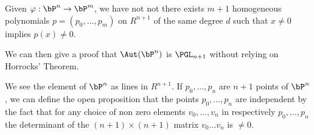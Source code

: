 \begin{lemma}\label{weakmap}
  Given $\varphi:\bP^n\rightarrow  \bP^m$, we have not not there exists
  $m+1$ homogeneous polynomials $p = (p_0,\dots,p_m)$ on $R^{n+1}$
  of the same   degree $d$ such that $x\neq 0$ implies $p(x)\neq 0$.
\end{lemma}




 We can then give a proof that   $\Aut(\bP^n)$ is $\PGL_{n+1}$ without relying on Horrocks' Theorem.

We see the element of $\bP^n$ as lines in $R^{n+1}$.
If $p_0,\dots,p_n$ are $n+1$ points of $\bP^n$, we can define the open proposition that
the points $p_0,\dots,p_n$ are independent
by the fact that for any choice of non zero elements $v_0,\dots,v_n$ in respectively $p_0,\dots,p_n$
the determinant of the $(n+1)\times (n+1)$ matrix $v_0\dots v_n$ is $\neq 0$.

